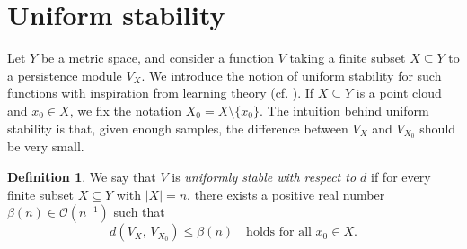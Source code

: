 \documentclass[10pt,a4paper]{article}
\theoremstyle{definition}
\newtheorem{defn}[thm]{Definition}
\begin{document}
\section{Uniform stability}
Let $Y$ be a metric space, and consider a function $V$ taking a finite subset $X\subseteq Y$ to a persistence module $V_X$. We introduce the notion of uniform stability for such functions with inspiration from learning theory (cf. \cite{bousquet2002stability}). If $X\subseteq Y$ is a point cloud and $x_0\in X$, we fix the notation $X_0 = X\setminus\{x_0\}$. The intuition behind uniform stability is that, given enough samples, the difference between $V_X$ and $V_{X_0}$ should be very small.

\begin{defn}\label{def_uniform_stability}
	We say that $V$ is \textit{uniformly stable with respect to $d$} if for every finite subset $X\subseteq Y$ with $|X|=n$, there exists a positive real number $\beta(n)\in\mathcal{O}(n^{-1})$ such that
	\begin{equation}\label{eq_uniform_stability}
		 d\left(V_X,\,V_{X_0}\right) \leqslant \beta(n)\quad\text{holds for all }x_0\in X.
	\end{equation}
\end{defn}

\end{document}
